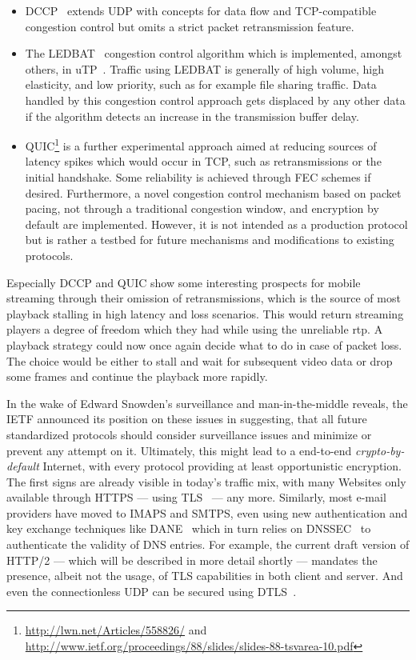 \begin{itemize}
	\item \gls{DCCP}~\cite{rfc4340} extends \gls{UDP} with concepts for data flow and \gls{TCP}-compatible congestion control but omits a strict packet retransmission feature.

	\item The \gls{LEDBAT}~\cite{rfc6817} congestion control algorithm which is implemented, amongst others, in \gls{uTP}~\cite{bt2010utp}. Traffic using \gls{LEDBAT} is generally of high volume, high elasticity, and low priority, such as for example file sharing traffic. Data handled by this congestion control approach gets displaced by any other data if the algorithm detects an increase in the transmission buffer delay.

	\item \gls{QUIC}\footnote{\url{http://lwn.net/Articles/558826/} and \url{http://www.ietf.org/proceedings/88/slides/slides-88-tsvarea-10.pdf}} is a further experimental approach aimed at reducing sources of latency spikes which would occur in \gls{TCP}, such as retransmissions or the initial handshake. Some reliability is achieved through \gls{FEC} schemes if desired. Furthermore, a novel congestion control mechanism based on packet pacing, not through a traditional congestion window, and encryption by default are implemented. However, it is not intended as a production protocol but is rather a testbed for future mechanisms and modifications to existing protocols.
\end{itemize}
%
Especially \gls{DCCP} and \gls{QUIC} show some interesting prospects for mobile streaming through their omission of retransmissions, which is the source of most playback stalling in high latency and loss scenarios. This would return streaming players a degree of freedom which they had while using the unreliable \gls{rtp}. A playback strategy could now once again decide what to do in case of packet loss. The choice would be either to stall and wait for subsequent video data or drop some frames and continue the playback more rapidly.

In the wake of Edward Snowden's surveillance and man-in-the-middle reveals, the \gls{IETF} announced its position on these issues in \cite{rfc6973} suggesting, that all future standardized protocols should consider surveillance issues and minimize or prevent any attempt on it. Ultimately, this might lead to a end-to-end \textit{crypto-by-default} Internet, with every protocol providing at least opportunistic encryption. The first signs are already visible in today's traffic mix, with many Websites only available through \acrshort{HTTPS} --- using \gls{TLS}~\cite{rfc5246} --- any more. Similarly, most e-mail providers have moved to \acrshort{IMAPS} and \acrshort{SMTPS}, even using new authentication and key exchange techniques like \gls{DANE}~\cite{rfc6698} which in turn relies on \gls{DNSSEC}~\cite{rfc4033} to authenticate the validity of \gls{DNS} entries. For example, the current draft version of \gls{HTTP}/2 --- which will be described in more detail shortly --- mandates the presence, albeit not the usage, of \gls{TLS} capabilities in both client and server. And even the connectionless \gls{UDP} can be secured using \gls{DTLS}~\cite{rfc6347}.


